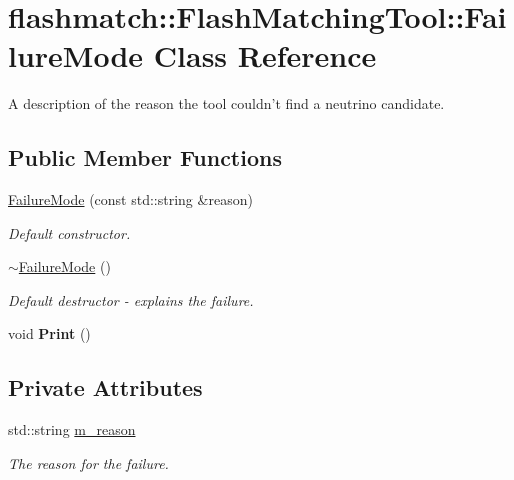 \hypertarget{classflashmatch_1_1FlashMatchingTool_1_1FailureMode}{\section{flashmatch\-:\-:Flash\-Matching\-Tool\-:\-:Failure\-Mode Class Reference}
\label{classflashmatch_1_1FlashMatchingTool_1_1FailureMode}
}


A description of the reason the tool couldn't find a neutrino candidate.  


\subsection*{Public Member Functions}
\begin{DoxyCompactItemize}
\item 
\hyperlink{classflashmatch_1_1FlashMatchingTool_1_1FailureMode_adcdc5adb8c7321605b8f9ef7740ea209}{Failure\-Mode} (const std\-::string \&reason)
\begin{DoxyCompactList}\small\item\em Default constructor. \end{DoxyCompactList}\item 
\hypertarget{classflashmatch_1_1FlashMatchingTool_1_1FailureMode_ab6ee2b8304974614e71440359a068acd}{\hyperlink{classflashmatch_1_1FlashMatchingTool_1_1FailureMode_ab6ee2b8304974614e71440359a068acd}{$\sim$\-Failure\-Mode} ()}\label{classflashmatch_1_1FlashMatchingTool_1_1FailureMode_ab6ee2b8304974614e71440359a068acd}

\begin{DoxyCompactList}\small\item\em Default destructor -\/ explains the failure. \end{DoxyCompactList}\item 
\hypertarget{classflashmatch_1_1FlashMatchingTool_1_1FailureMode_a2e0b3138a293e90410b3037952c819bc}{void {\bfseries Print} ()}\label{classflashmatch_1_1FlashMatchingTool_1_1FailureMode_a2e0b3138a293e90410b3037952c819bc}

\end{DoxyCompactItemize}
\subsection*{Private Attributes}
\begin{DoxyCompactItemize}
\item 
\hypertarget{classflashmatch_1_1FlashMatchingTool_1_1FailureMode_ad236e712ac187b60a5647ad4bf29cf07}{std\-::string \hyperlink{classflashmatch_1_1FlashMatchingTool_1_1FailureMode_ad236e712ac187b60a5647ad4bf29cf07}{m\-\_\-reason}}\label{classflashmatch_1_1FlashMatchingTool_1_1FailureMode_ad236e712ac187b60a5647ad4bf29cf07}

\begin{DoxyCompactList}\small\item\em The reason for the failure. \end{DoxyCompactList}\end{DoxyCompactItemize}


